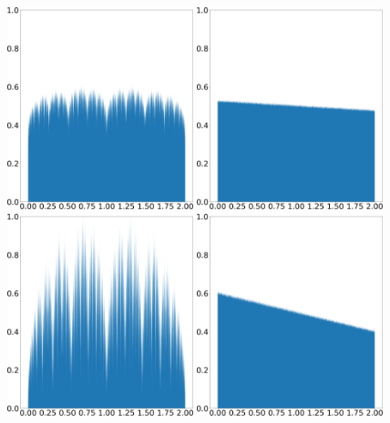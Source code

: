 \documentclass[preprint,12pt]{elsarticle}
\begin{document}
\begin{figure}
    \centering
    \includegraphics[width=0.48\textwidth]{tent_pinched_shadow_density_0.05.png}
    \hspace{0.02\textwidth}
    \includegraphics[width=0.48\textwidth]{tent_pinched_physical_density_0.05.png}
    \\ \vspace{0.02\textwidth}
    \includegraphics[width=0.48\textwidth]{tent_pinched_shadow_density_0.2.png}
    \hspace{0.02\textwidth}
    \includegraphics[width=0.48\textwidth]{tent_pinched_physical_density_0.2.png}

\end{figure}
\end{document}
